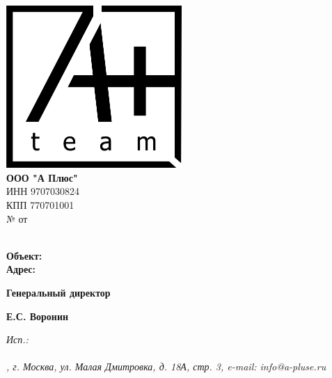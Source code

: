 \documentclass[a4paper,12pt]{letter}
\begin{document}
\noindent
\begin{minipage}[t]{0.5\textwidth}
    \vspace{0pt} %
    \includegraphics[width=0.5\textwidth]{A.png} \\ %
    \textbf{ООО "А Плюс"} \\
    ИНН 9707030824 \\
    КПП 770701001 \\
    № \textbf{  } от \textbf{  } \\
\end{minipage}%

\begin{minipage}[t]{0.5\textwidth} 
    \textbf{} \\
    \textbf{Объект:}  \\
    \textbf{Адрес:} 
\end{minipage}%
\begin{minipage}[t]{0.5\textwidth}
    \raggedleft
    \bfseries
    
\end{minipage}

\vspace{1cm}

\begin{center}
    \textbf{  }
\end{center}


\vspace{0.5cm}



\vspace{1cm}


\begin{minipage}[t]{0.4\textwidth}
    \textbf{Генеральный директор}
\end{minipage}%
\begin{minipage}[t]{0.2\textwidth}
    \centering
    \underline{\hspace{5cm}}
\end{minipage}%
\begin{minipage}[t]{0.4\textwidth}
    \raggedleft
    \textbf{Е.С. Воронин}
\end{minipage}


\vfill

\noindent
\itshape
Исп.:  \\
 \\


\noindent\makebox[\linewidth]{\rule{1\paperwidth}{0.4pt}}
\noindent
\centering
\fontsize{9}{10}, г. Москва, ул. Малая Дмитровка, д. 18А, стр. 3, e-mail: info@a-pluse.ru
\end{document}
